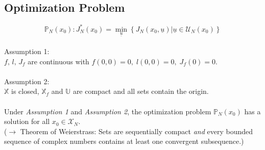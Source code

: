 \documentclass[english]{latex4ei/latex4ei_sheet}
\begin{document}
\begin{sectionbox}
\subsection{Optimization Problem}
$$
\mathbb{P}_{N}\left(x_{0}\right): J_{N}^{*}\left(x_{0}\right)=\min _{\underline{u}}\left\{J_{N}\left(x_{0}, \underline{u}\right) | \underline{u} \in \mathcal{U}_{N}\left(x_{0}\right)\right\}
$$
\\
Assumption 1:\\
$f,\,l,\,J_f$ are continuous with $f(0,0)=0,\; l(0,0)=0,\; J_f(0)=0$.\\
\\
Assumption 2:\\
$\mathbb{X}$ is closed, $\mathbb{X}_f$ and $\mathbb{U}$ are compact and all sets contain the origin.\\
\\
Under \textit{Assumption 1} and \textit{Assumption 2}, the optimization problem $\mathbb{P}_N(x_0)$ has a solution for all $x_0\in\mathcal{X}_N$. \\($\rightarrow$ Theorem of Weierstrass: Sets are sequentially compact \textit{and} every bounded sequence of complex numbers contains at least one convergent subsequence.)

\end{sectionbox}
\end{document}
